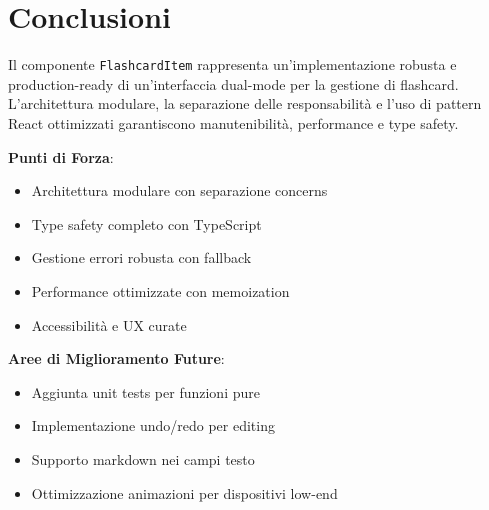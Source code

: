 \documentclass[11pt,a4paper]{article}
\begin{document}
\section{Conclusioni}

Il componente \texttt{FlashcardItem} rappresenta un'implementazione robusta e production-ready di un'interfaccia dual-mode per la gestione di flashcard. L'architettura modulare, la separazione delle responsabilità e l'uso di pattern React ottimizzati garantiscono manutenibilità, performance e type safety.

\textbf{Punti di Forza}:
\begin{itemize}
    \item Architettura modulare con separazione concerns
    \item Type safety completo con TypeScript
    \item Gestione errori robusta con fallback
    \item Performance ottimizzate con memoization
    \item Accessibilità e UX curate
\end{itemize}

\textbf{Aree di Miglioramento Future}:
\begin{itemize}
    \item Aggiunta unit tests per funzioni pure
    \item Implementazione undo/redo per editing
    \item Supporto markdown nei campi testo
    \item Ottimizzazione animazioni per dispositivi low-end
\end{itemize}
\end{document}
